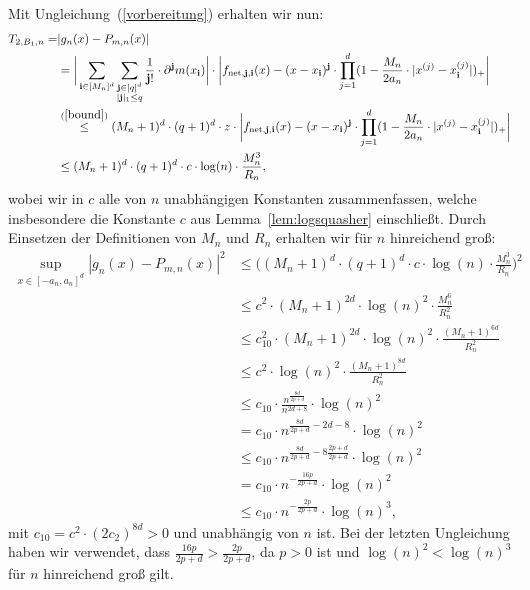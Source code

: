 {Mit Ungleichung~(\ref{vorbereitung}) erhalten wir nun:
\begin{equation}
\label{1stsum}
\begin{split}
T_{2,B_1,n} = & |g_n(x) - P_{m,n}(x)| \\
& = \bigg| \sum_{\mathbf{i} \in [M_n]^d} \sum_{\substack{ \mathbf{j} \in [q]^d \\ |\mathbf{j}|_1 \leq q}} \frac{1}{\mathbf{j}!} \cdot \partial^{\mathbf{j}} m (x_{\mathbf{i}}) \bigg| \cdot \bigg| f_{\mathrm{net},\mathbf{j},\mathbf{i}}(x) - (x - x_{\mathbf{i}})^{\mathbf{j}} \cdot \prod_{j = 1}^d(1 - \frac{M_n}{2a_n} \cdot |x^{(j)} - x_{\mathbf{i}}^{(j)}|)_+ \bigg| \\
& \stackrel{(\ref{bound})}{\leq} (M_n + 1)^d \cdot (q + 1)^d \cdot z \cdot \bigg| f_{\mathrm{net},\mathbf{j},\mathbf{i}}(x) - (x - x_{\mathbf{i}})^{\mathbf{j}} \cdot \prod_{j = 1}^d(1 - \frac{M_n}{2a_n} \cdot |x^{(j)} - x_{\mathbf{i}}^{(j)}|)_+ \bigg| \\
& \leq  (M_n + 1)^d \cdot (q + 1)^d \cdot c\cdot \log(n) \cdot \frac{M_n^3}{R_n},
\end{split}
\end{equation}
wobei wir in $c$ alle von $n$ unabhängigen Konstanten zusammenfassen, welche insbesondere die Konstante $c$ aus Lemma~\ref{lem:logsquasher} einschließt.
Durch Einsetzen der Definitionen von $M_n$ und $R_n$ erhalten wir für $n$ hinreichend groß:
\begin{equation}
\label{3rdsum}
\begin{split}
\sup_{x \in [-a_n, a_n]^d} |g_n(x) - P_{m,n}(x)|^2 & \leq \bigg((M_n + 1)^d \cdot (q + 1)^d \cdot c \cdot \log(n) \cdot \frac{M_n^3}{R_n}\bigg)^2 \\
& \leq c^2 \cdot (M_n + 1)^{2d} \cdot \log(n)^2 \cdot \frac{M_n^6}{R_n^2} \\
& \leq  c_{10}^2 \cdot (M_n + 1)^{2d} \cdot \log(n)^2 \cdot \frac{(M_n + 1)^{6d}}{R_n^2} \\
& \leq  c^2 \cdot \log(n)^2 \cdot \frac{(M_n + 1)^{8d}}{R_n^2} \\
& \leq c_{10} \cdot \frac{n^{\frac{8d}{2p + d}}}{n^{2d + 8}} \cdot \log(n)^2 \\
& = c_{10} \cdot n^{\frac{8d}{2p + d} - 2d -8} \cdot \log(n)^2 \\
& \leq c_{10} \cdot n^{\frac{8d}{2p + d}  -8\frac{2p + d}{2p + d}} \cdot \log(n)^2 \\
& = c_{10} \cdot n^{-\frac{16p}{2p + d}} \cdot \log(n)^2 \\
& \leq c_{10} \cdot n^{-\frac{2p}{2p + d}} \cdot \log(n)^3,
\end{split}
\end{equation}
mit $c_{10} = c^2 \cdot (2c_2)^{8d} > 0$ und unabhängig von $n$ ist. Bei der letzten Ungleichung haben wir verwendet, dass $\frac{16p}{2p + d} > \frac{2p}{2p + d}$, da $p > 0$ ist und $\log(n)^2 < \log(n)^3$ für $n$ hinreichend groß gilt.

}
